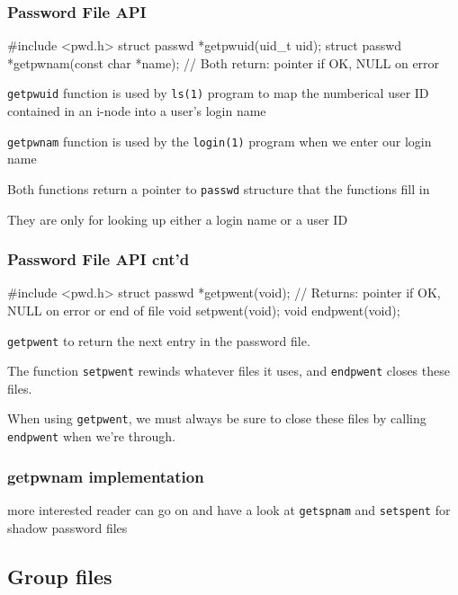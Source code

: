 \documentclass[newPxFont,sthlmFooter,nooffset]{beamer}
\begin{document}
\begin{frame}[containsverbatim,t]
  \frametitle{Password File API }
\begin{codedef}
#include <pwd.h>
struct passwd *getpwuid(uid_t uid);
struct passwd *getpwnam(const char *name);
// Both return: pointer if OK, NULL on error  
\end{codedef}

\texttt{getpwuid} function is used by \texttt{ls(1)} program to map the numberical user ID contained in an i-node into a user's login name

\texttt{getpwnam} function is used by the \texttt{login(1)} program when we enter our login name

Both functions return a pointer to \texttt{passwd} structure that the functions fill in

They are only for looking up either a login name or a user ID
\end{frame}



\begin{frame}[containsverbatim,t]
  \frametitle{Password File API cnt'd}

\begin{codedef}
#include <pwd.h>
struct passwd *getpwent(void);
// Returns: pointer if OK, NULL on error or end of file
void setpwent(void);
void endpwent(void);
\end{codedef}

\texttt{getpwent} to return the next entry in the password file. 

The function \texttt{setpwent} rewinds whatever files it uses, and \texttt{endpwent} closes these files.

 When using \texttt{getpwent}, we must always be sure to close these files by calling \texttt{endpwent} when we’re through. 
\end{frame}


\begin{frame}[containsverbatim,t]
  \frametitle{getpwnam implementation}


more interested reader can go on and have a look at \texttt{getspnam} and \texttt{setspent} for shadow password files
\end{frame}


\subsection{Group files}
\end{document}
